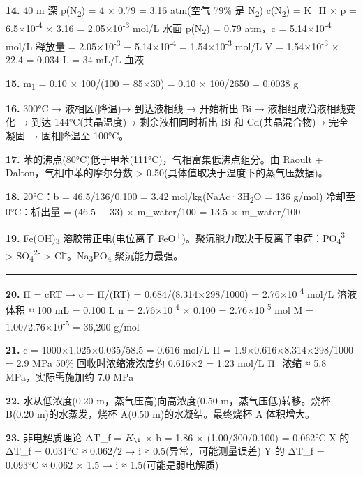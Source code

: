 \documentclass[a4paper,11pt]{ctexart}
\begin{document}
\textbf{14.} 40 m 深 p(N\textsubscript{2}) = 4 × 0.79 = 3.16 atm(空气 79\% 是 N\textsubscript{2})
c(N\textsubscript{2}) = K\_H × p = 6.5×10\textsuperscript{-4} × 3.16 = 2.05×10\textsuperscript{-3} mol/L
水面 p(N\textsubscript{2}) = 0.79 atm，c = 5.14×10\textsuperscript{-4} mol/L
释放量 = 2.05×10\textsuperscript{-3} − 5.14×10\textsuperscript{-4} = 1.54×10\textsuperscript{-3} mol/L
V = 1.54×10\textsuperscript{-3} × 22.4 = 0.034 L = 34 mL/L 血液

\textbf{15.} m\textsubscript{1} = 0.10 × 100/(100 + 85×30) = 0.10 × 100/2650 = 0.0038 g

\textbf{16.} 300°C → 液相区(降温)→ 到达液相线 → 开始析出 Bi → 液相组成沿液相线变化 → 到达 144°C(共晶温度)→ 剩余液相同时析出 Bi 和 Cd(共晶混合物)→ 完全凝固 → 固相降温至 100°C。

\textbf{17.} 苯的沸点(80°C)低于甲苯(111°C)，气相富集低沸点组分。由 Raoult + Dalton，气相中苯的摩尔分数 \textgreater{} 0.50(具体值取决于温度下的蒸气压数据)。

\textbf{18.} 20°C：b = 46.5/136/0.100 = 3.42 mol/kg(NaAc·3H\textsubscript{2}O = 136 g/mol)
冷却至 0°C：析出量 = (46.5 − 33) × m\_water/100 = 13.5 × m\_water/100

\textbf{19.} Fe(OH)\textsubscript{3} 溶胶带正电(电位离子 FeO\textsuperscript{+})。聚沉能力取决于反离子电荷：PO\textsubscript{4}\textsuperscript{3-} \textgreater{} SO\textsubscript{4}\textsuperscript{2-} \textgreater{} Cl\textsuperscript{-}。Na\textsubscript{3}PO\textsubscript{4} 聚沉能力最强。

\begin{center}\rule{0.5\linewidth}{0.5pt}\end{center}

\textbf{20.} Π = cRT → c = Π/(RT) = 0.684/(8.314×298/1000) = 2.76×10\textsuperscript{-4} mol/L
溶液体积 ≈ 100 mL = 0.100 L
n = 2.76×10\textsuperscript{-4} × 0.100 = 2.76×10\textsuperscript{-5} mol
M = 1.00/2.76×10\textsuperscript{-5} = 36,200 g/mol

\textbf{21.} c = 1000×1.025×0.035/58.5 = 0.616 mol/L
Π = 1.9×0.616×8.314×298/1000 = 2.9 MPa
50\% 回收时浓缩液浓度约 0.616×2 = 1.23 mol/L
Π\_浓缩 ≈ 5.8 MPa，实际需施加约 7.0 MPa

\textbf{22.} 水从低浓度(0.20 m，蒸气压高)向高浓度(0.50 m，蒸气压低)转移。烧杯 B(0.20 m)的水蒸发，烧杯 A(0.50 m)的水凝结。最终烧杯 A 体积增大。

\textbf{23.} 非电解质理论 ΔT\_f = \(K_{\1}\) × b = 1.86 × (1.00/300/0.100) = 0.062°C
X 的 ΔT\_f = 0.031°C ≈ 0.062/2 → i ≈ 0.5(异常，可能测量误差)
Y 的 ΔT\_f = 0.093°C ≈ 0.062 × 1.5 → i ≈ 1.5(可能是弱电解质)
\end{document}

